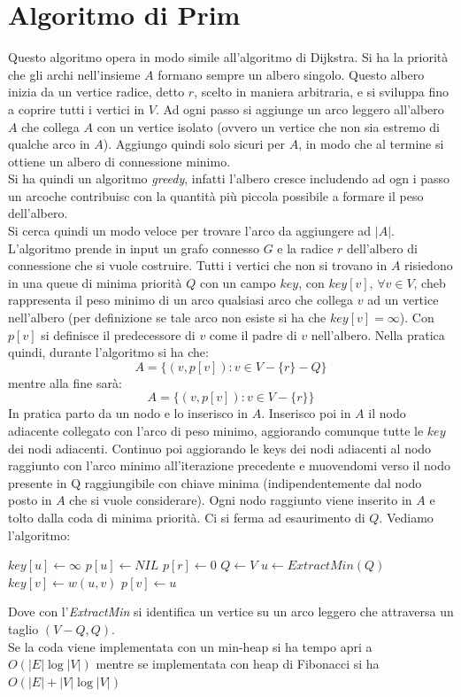 \documentclass[a4paper,12pt, oneside]{book}
\begin{document}
\section{Algoritmo di Prim}
Questo algoritmo opera in modo simile all'algoritmo di Dijkstra. Si ha
la priorità che gli archi nell'insieme $A$ formano sempre un albero
singolo. Questo albero inizia da un vertice radice, detto $r$, scelto
in maniera arbitraria, e si sviluppa fino a coprire tutti i vertici in
$V$. Ad ogni passo si aggiunge un arco leggero all'albero $A$ che
collega $A$ con un vertice isolato (ovvero un vertice che non sia
estremo di qualche arco in $A$). Aggiungo quindi solo sicuri per $A$,
in modo che al termine si ottiene un albero di connessione minimo. \\
Si ha quindi un algoritmo \textit{greedy}, infatti l'albero cresce
includendo ad ogn i passo un arcoche contribuisc con la quantità più
piccola possibile a formare il peso dell'albero.\\
Si cerca quindi un modo veloce per trovare l'arco da aggiungere ad
$|A|$. L'algoritmo prende in input un grafo connesso $G$ e la radice
$r$ dell'albero di connessione che si vuole costruire. Tutti i vertici
che non si trovano in $A$ risiedono in una queue di minima priorità
$Q$ con un campo $key$, con $key[v]$, $\forall v\in V$, cheb
rappresenta il peso minimo di un arco qualsiasi arco che collega $v$
ad un vertice nell'albero (per definizione se tale arco non esiste si
ha che $key[v]=\infty$). Con $p[v]$ si definisce il predecessore di
$v$ come il padre di $v$ nell'albero. Nella pratica quindi, durante
l'algoritmo si ha che:
\[A=\{(v,p[v]):v\in V-\{r\}-Q\}\]
mentre alla fine sarà:
\[A=\{(v,p[v]):v\in V-\{r\}\}\]
In pratica parto da un nodo e lo inserisco in $A$. Inserisco poi in
$A$ il nodo adiacente collegato con l'arco di peso minimo, aggiorando
comunque tutte le $key$ dei nodi adiacenti. Continuo poi aggiorando le
keys dei nodi adiacenti al nodo raggiunto con l'arco minimo
all'iterazione precedente e muovendomi verso il nodo presente in Q
raggiungibile con chiave minima (indipendentemente dal nodo posto in
$A$ che si vuole considerare). Ogni nodo raggiunto viene inserito in
$A$ e tolto dalla coda di minima priorità. Ci si ferma ad esaurimento
di $Q$.
Vediamo l'algoritmo:
\begin{algorithm}
  \begin{algorithmic}
    \State $key[u]\gets \infty$
    \State $p[u]\gets NIL$
    \EndFor
    \State $p[r]\gets 0$
    \State $Q\gets V$
    \State $u\gets ExtractMin(Q)$
    \State $key[v]\gets w(u,v)$
    \State $p[v]\gets u$
    \EndIf
    \EndFor
    \EndWhile
    \EndFunction
  \end{algorithmic}
\end{algorithm}
Dove con l'\textit{ExtractMin} si identifica un vertice su un arco
leggero che attraversa un taglio $(V-Q,Q)$.\\
Se la coda viene implementata con un min-heap si ha tempo apri a
$O(|E|\log |V|)$ mentre se implementata con heap di Fibonacci si ha
$O(|E|+|V|\log |V|)$
\end{document}
